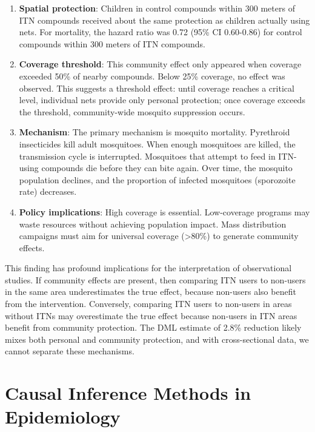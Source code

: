 \begin{enumerate}
	\item \textbf{Spatial protection}: Children in control compounds within 300 meters of ITN compounds received about the same protection as children actually using nets. For mortality, the hazard ratio was 0.72 (95\% CI 0.60-0.86) for control compounds within 300 meters of ITN compounds.
	
	\item \textbf{Coverage threshold}: This community effect only appeared when coverage exceeded 50\% of nearby compounds. Below 25\% coverage, no effect was observed. This suggests a threshold effect: until coverage reaches a critical level, individual nets provide only personal protection; once coverage exceeds the threshold, community-wide mosquito suppression occurs.
	
	\item \textbf{Mechanism}: The primary mechanism is mosquito mortality. Pyrethroid insecticides kill adult mosquitoes. When enough mosquitoes are killed, the transmission cycle is interrupted. Mosquitoes that attempt to feed in ITN-using compounds die before they can bite again. Over time, the mosquito population declines, and the proportion of infected mosquitoes (sporozoite rate) decreases.
	
	\item \textbf{Policy implications}: High coverage is essential. Low-coverage programs may waste resources without achieving population impact. Mass distribution campaigns must aim for universal coverage (>80\%) to generate community effects.
\end{enumerate}

This finding has profound implications for the interpretation of observational studies. If community effects are present, then comparing ITN users to non-users in the same area underestimates the true effect, because non-users also benefit from the intervention. Conversely, comparing ITN users to non-users in areas without ITNs may overestimate the true effect because non-users in ITN areas benefit from community protection. The DML estimate of 2.8\% reduction likely mixes both personal and community protection, and with cross-sectional data, we cannot separate these mechanisms.

\section{Causal Inference Methods in Epidemiology}


